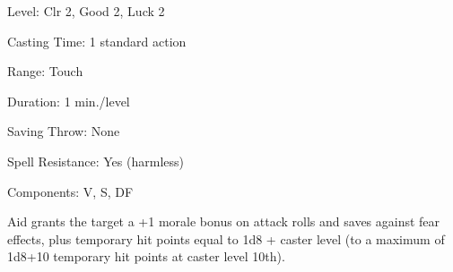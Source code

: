 
\begin{description*}
\item[Level:] Clr 2, Good 2, Luck 2
\item[Casting Time:] 1 standard action
\item[Range:] Touch
\item[Duration:] 1 min./level
\item[Saving Throw:] None
\item[Spell Resistance:] Yes (harmless)
\item[Components:] V, S, DF
\end{description*}

Aid grants the target a +1 morale bonus on attack rolls and saves against
fear effects, plus temporary hit points equal to 1d8 + caster level (to a maximum
of 1d8+10 temporary hit points at caster level 10th).